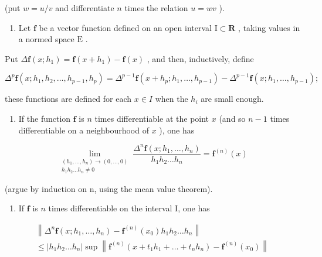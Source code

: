 (put \(w = u / v\) and differentiate \(n\) times the relation \(u = wv\) ).

\begin{enumerate}
\def\labelenumi{\arabic{enumi})}
\setcounter{enumi}{5}
\tightlist
\item
  Let \(\mathbf{f}\) be a vector function defined on an open interval \(\mathrm{I} \subset \mathbf{R}\) , taking values in a normed space \(\mathrm{E}\) .
\end{enumerate}

Put \(\Delta \mathbf{f}(x; h_1) = \mathbf{f}(x + h_1) - \mathbf{f}(x)\) , and then, inductively, define

\[
\Delta^ {p} \mathbf {f} (x; h _ {1}, h _ {2}, \dots , h _ {p - 1}, h _ {p}) = \Delta^ {p - 1} \mathbf {f} (x + h _ {p}; h _ {1}, \dots , h _ {p - 1}) - \Delta^ {p - 1} \mathbf {f} (x; h _ {1}, \dots , h _ {p - 1});
\]

these functions are defined for each \(x \in I\) when the \(h_{i}\) are small enough.

\begin{enumerate}
\def\labelenumi{\alph{enumi})}
\tightlist
\item
  If the function \(\mathbf{f}\) is \(n\) times differentiable at the point \(x\) (and so \(n - 1\) times differentiable on a neighbourhood of \(x\) ), one has
\end{enumerate}

\[
\lim_{\substack{(h_{1},\ldots ,h_{n})\to (0,\ldots ,0)\\ h_{1}h_{2}\ldots h_{n}\neq 0}}\frac{\varDelta^{n}\mathbf{f}(x;h_{1},\ldots,h_{n})}{h_{1}h_{2}\ldots h_{n}} = \mathbf{f}^{(n)}(x)
\]

(argue by induction on n, using the mean value theorem).

\begin{enumerate}
\def\labelenumi{\alph{enumi})}
\setcounter{enumi}{1}
\tightlist
\item
  If \(\mathbf{f}\) is \(n\) times differentiable on the interval I, one has
\end{enumerate}

\[
\begin{array}{l} \left\| \Delta^ {n} \mathbf {f} (x; h _ {1}, \ldots , h _ {n}) - \mathbf {f} ^ {(n)} (x _ {0}) h _ {1} h _ {2} \ldots h _ {n} \right\| \\ \leqslant | h _ {1} h _ {2} \ldots h _ {n} | \sup \left\| \mathbf {f} ^ {(n)} (x + t _ {1} h _ {1} + \dots + t _ {n} h _ {n}) - \mathbf {f} ^ {(n)} (x _ {0}) \right\| \end{array}
\]

